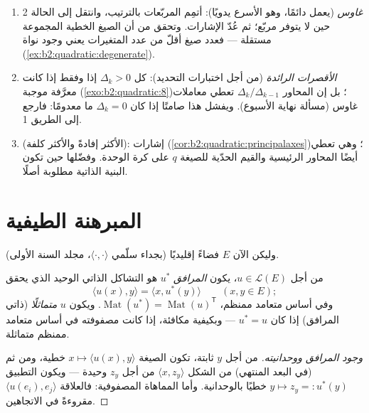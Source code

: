 \begin{method}\label{met:b2:quadratic:signature}
\begin{enumerate}
  \item \emph{غاوس} (يعمل دائمًا، وهو الأسرع يدويًا): أتمِم
        المربّعات بالترتيب، وانتقل إلى الحالة 2 حين لا يتوفر مربّع؛
        ثم عُدّ الإشارات. وتحقق من أن الصيغ الخطية المجموعة
        مستقلة --- فعدد صيغ أقلّ من عدد المتغيرات يعني وجود
        نواة (\cref{ex:b2:quadratic:degenerate}).
  \item \emph{الأقصرات الرائدة} (من أجل اختبارات التحديد): كل
        $\Delta_k > 0$ إذا وفقط إذا كانت معرَّفة موجبة
        (\cref{exo:b2:quadratic:8})؛ بل إن المحاور
        $\Delta_k/\Delta_{k-1}$ تعطي معاملات
        غاوس (مسألة نهاية الأسبوع). ويفشل هذا صامتًا إذا كان
        $\Delta_k = 0$ ما معدومًا: فارجع إلى الطريق 1.
  \item \emph{} (الأكثر إفادةً والأكثر كلفة):
        إشارات 
        (\cref{cor:b2:quadratic:principalaxes})؛ وهي تعطي أيضًا
        المحاور الرئيسية والقيم الحدّية للصيغة $q$ على
        كرة الوحدة. وفضّلها حين تكون البنية الذاتية
        مطلوبة أصلًا.
\end{enumerate}
\end{method}

\section{المبرهنة الطيفية}

وليكن الآن $E$ فضاءً إقليديًا (بجداء سلّمي $\langle\cdot,\cdot\rangle$،
مجلد السنة الأولى).

\begin{definition}\label{def:b2:quadratic:adjoint}
من أجل $u \in \mathcal{L}(E)$، يكون \emph{المرافق}
$u^*$ هو التشاكل الذاتي الوحيد الذي يحقق
\[
\langle u(x), y\rangle = \langle x, u^*(y)\rangle
\qquad (x, y \in E);
\]
وفي أساس متعامد ممنظم، $\operatorname{Mat}(u^*) =
\operatorname{Mat}(u)^{\mathsf T}$. ويكون $u$
\emph{متماثلًا} (ذاتي المرافق) إذا كان
$u^* = u$ --- وبكيفية مكافئة، إذا كانت مصفوفته في أساس متعامد ممنظم
متماثلة.
\end{definition}

\begin{proof}[وجود المرافق ووحدانيته]
من أجل $y$ ثابتة، تكون الصيغة $x \mapsto \langle u(x), y\rangle$
خطية، ومن ثم (في البعد المنتهي) من الشكل $\langle x,
z_y\rangle$ من أجل $z_y$ وحيدة --- ويكون التطبيق $y \mapsto z_y =:
u^*(y)$ خطيًا بالوحدانية. وأما المماهاة المصفوفية:
فالعلاقة $\langle u(e_i), e_j\rangle$ مقروءةً في الاتجاهين.
\end{proof}

